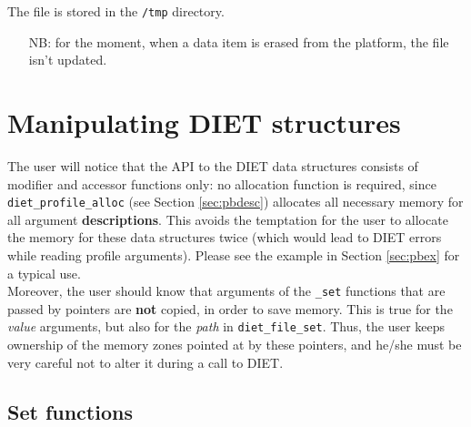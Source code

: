 The file is stored in the \texttt{/tmp} directory.

\begin{itemize}
\item[NB:] for the moment, when a data item is erased from the platform, the
file isn't updated.
\end{itemize}


\section{Manipulating DIET structures}
\label{sec:manip}

The user will notice that the API to the DIET data structures consists of
modifier and accessor functions only: no allocation function is required, since
\texttt{diet\_profile\_alloc} (see Section \ref{sec:pbdesc}) allocates all
necessary memory for all argument \textbf{descriptions}. This avoids the
temptation for the user to allocate the memory for these data structures twice
(which would lead to DIET errors while reading profile arguments). Please see
the example in Section \ref{sec:pbex} for a typical use.
\\

Moreover, the user should know that arguments of the \texttt{\_set} functions
that are passed by pointers are \textbf{not} copied, in order to save memory.
This is true for the \emph{value} arguments, but also for the \emph{path} in
\texttt{diet\_file\_set}. Thus, the user keeps ownership of the memory zones
pointed at by these pointers, and he/she must be very careful not to alter it
during a call to DIET.

\subsection{Set functions}


